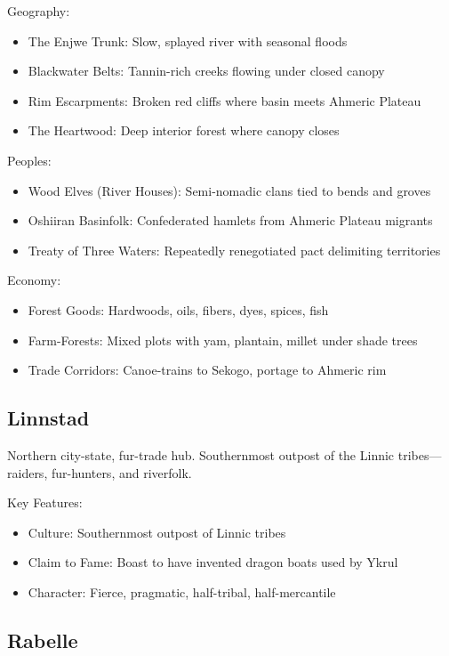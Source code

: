 Geography:
\begin{itemize}
    \item The Enjwe Trunk: Slow, splayed river with seasonal floods
    \item Blackwater Belts: Tannin-rich creeks flowing under closed canopy
    \item Rim Escarpments: Broken red cliffs where basin meets Ahmeric Plateau
    \item The Heartwood: Deep interior forest where canopy closes
\end{itemize}

Peoples:
\begin{itemize}
    \item Wood Elves (River Houses): Semi-nomadic clans tied to bends and groves
    \item Oshiiran Basinfolk: Confederated hamlets from Ahmeric Plateau migrants
    \item Treaty of Three Waters: Repeatedly renegotiated pact delimiting territories
\end{itemize}

Economy:
\begin{itemize}
    \item Forest Goods: Hardwoods, oils, fibers, dyes, spices, fish
    \item Farm-Forests: Mixed plots with yam, plantain, millet under shade trees
    \item Trade Corridors: Canoe-trains to Sekogo, portage to Ahmeric rim
\end{itemize}

\subsection{Linnstad}
\label{sec:linnstad}

Northern city-state, fur-trade hub. Southernmost outpost of the Linnic tribes---raiders, fur-hunters, and riverfolk.

Key Features:
\begin{itemize}
    \item Culture: Southernmost outpost of Linnic tribes
    \item Claim to Fame: Boast to have invented dragon boats used by Ykrul
    \item Character: Fierce, pragmatic, half-tribal, half-mercantile
\end{itemize}

\subsection{Rabelle}
\label{sec:rabelle}

